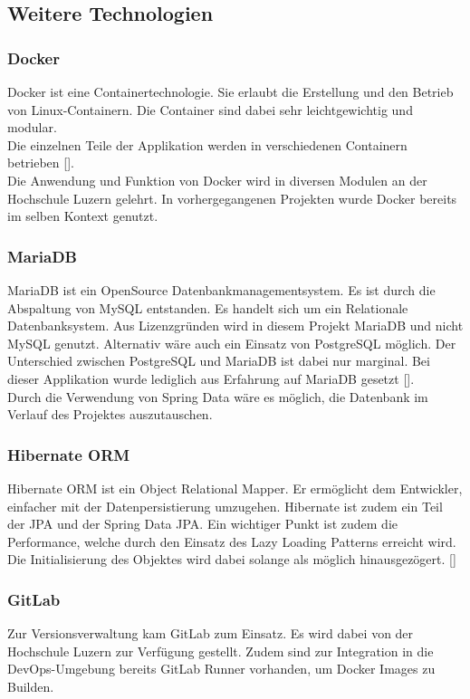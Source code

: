 \subsection{Weitere Technologien}
\subsubsection{Docker}
Docker ist eine Containertechnologie. Sie erlaubt die Erstellung und den Betrieb von Linux-Containern. Die Container sind dabei sehr leichtgewichtig und modular.\\
Die einzelnen Teile der Applikation werden in verschiedenen Containern betrieben [\cite{docker}].\\
Die Anwendung und Funktion von Docker wird in diversen Modulen an der Hochschule Luzern gelehrt. In vorhergegangenen Projekten wurde Docker bereits im selben Kontext genutzt. 

\subsubsection{MariaDB}\label{mariadb}
MariaDB ist ein OpenSource Datenbankmanagementsystem. Es ist durch die Abspaltung von MySQL entstanden. Es handelt sich um ein Relationale Datenbanksystem. 
Aus Lizenzgründen wird in diesem Projekt MariaDB und nicht MySQL genutzt. Alternativ wäre auch ein Einsatz von PostgreSQL möglich. Der Unterschied zwischen PostgreSQL und MariaDB ist dabei nur marginal. Bei dieser Applikation wurde lediglich aus Erfahrung auf MariaDB gesetzt [\cite{mariadbVsPostgresql}]. \\
Durch die Verwendung von Spring Data wäre es möglich, die Datenbank im Verlauf des Projektes auszutauschen. 

\subsubsection{Hibernate ORM}
Hibernate ORM ist ein Object Relational Mapper. 
Er ermöglicht dem Entwickler, einfacher mit der Datenpersistierung umzugehen. Hibernate ist zudem ein Teil der \ac{JPA} und der Spring Data JPA. 
Ein wichtiger Punkt ist zudem die Performance, welche durch den Einsatz des Lazy Loading Patterns erreicht wird. Die Initialisierung des Objektes wird dabei solange als möglich hinausgezögert. [\cite{hibernateORM}]

\subsubsection{\gls{GitLab}}
Zur Versionsverwaltung kam \gls{GitLab} zum Einsatz. Es wird dabei von der Hochschule Luzern zur Verfügung gestellt. Zudem sind zur Integration in die \gls{DevOps}-Umgebung bereits GitLab Runner vorhanden, um Docker Images zu Builden. 

